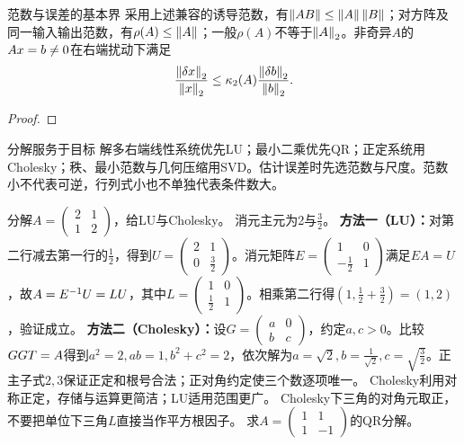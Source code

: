 \begin{theorem}{范数与误差的基本界}
采用上述兼容的诱导范数，有$\left\lVert AB\right\rVert\le\left\lVert A\right\rVert\left\lVert B\right\rVert$；对方阵及同一输入输出范数，有$\rho(A)\le\left\lVert A\right\rVert$；一般$\rho(A)$不等于$\left\lVert A\right\rVert_2$。非奇异$A$的$Ax=b\ne0$在右端扰动下满足
\begin{equation}\dfrac{\left\lVert\delta x\right\rVert_2}{\left\lVert x\right\rVert_2}\le\kappa_2(A)\dfrac{\left\lVert\delta b\right\rVert_2}{\left\lVert b\right\rVert_2}.\end{equation}
\end{theorem}
\begin{proof}

\end{proof}
\begin{method}{分解服务于目标}
解多右端线性系统优先LU；最小二乘优先QR；正定系统用Cholesky；秩、最小范数与几何压缩用SVD。估计误差时先选范数与尺度。范数小不代表可逆，行列式小也不单独代表条件数大。
\end{method}
{分解$A=\begin{pmatrix}2&1\\1&2\end{pmatrix}$，给LU与Cholesky。}
{消元主元为2与$\frac{3}{2}$。}
{\textbf{方法一（LU）：}对第二行减去第一行的$\frac{1}{2}$，得到$U=\begin{pmatrix}2&1\\0&\frac{3}{2}\end{pmatrix}$。消元矩阵$E=\begin{pmatrix}1&0\\-\frac{1}{2}&1\end{pmatrix}$满足$EA=U$，故$A=E^{-1} U=LU$，其中$L=\begin{pmatrix}1&0\\\frac{1}{2}&1\end{pmatrix}$。相乘第二行得$(1,\frac{1}{2}+\frac{3}{2})=(1,2)$，验证成立。
\textbf{方法二（Cholesky）：}设$G=\begin{pmatrix}a&0\\b&c\end{pmatrix}$，约定$a,c>0$。比较$GGT=A$得到$a^2=2,ab=1,b^2+c^2=2$，依次解为$a=\sqrt2,b=\frac{1}{\sqrt2},c=\sqrt{\frac{3}{2}}$。正主子式$2,3$保证正定和根号合法；正对角约定使三个数逐项唯一。}
{Cholesky利用对称正定，存储与运算更简洁；LU适用范围更广。}
{Cholesky下三角的对角元取正，不要把单位下三角$L$直接当作平方根因子。}
{求$A=\begin{pmatrix}1&1\\1&-1\end{pmatrix}$的QR分解。}
